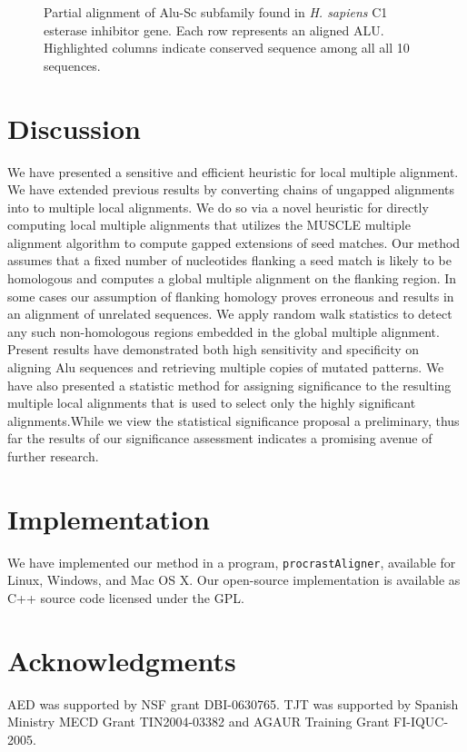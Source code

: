\documentclass{ws-procs9x6}
\begin{document}
\begin{figure}[t]
\centering {}
\caption{Partial alignment of Alu-Sc subfamily found in \emph{H. sapiens} C1 esterase inhibitor gene. Each row represents an aligned ALU. Highlighted columns indicate conserved sequence among all all 10 sequences.}
\label{fig-align}
\end{figure}

\section{Discussion}

We have presented a sensitive and efficient heuristic for local multiple alignment.
We have extended previous results by converting chains of ungapped alignments into to multiple local alignments. We do so via a novel heuristic for directly computing local multiple alignments that utilizes the MUSCLE multiple alignment algorithm to compute gapped extensions of seed matches.  Our method assumes that a fixed number of nucleotides flanking a seed match is likely to be homologous and computes a global multiple alignment on the flanking region.  In some cases our assumption of flanking homology proves erroneous and results in an alignment of unrelated sequences.  We apply random walk statistics to detect any such non-homologous regions embedded in the global multiple alignment.
Present results have demonstrated both high sensitivity and specificity on aligning Alu
sequences and retrieving multiple copies of mutated patterns. We have also presented a statistic method for assigning significance to the resulting multiple local alignments that is used to select only the highly significant alignments.While we view the statistical significance proposal a preliminary, thus far the results of our significance assessment indicates a promising avenue of further research.

\section{Implementation}
We have implemented our method in a program, \texttt{procrastAligner}, available for Linux, Windows, and Mac OS X. Our open-source implementation is available as C++ source code licensed under the GPL.

\section{ Acknowledgments }
AED was supported by NSF grant DBI-0630765. TJT was
supported by Spanish Ministry MECD Grant TIN2004-03382 and AGAUR
Training Grant FI-IQUC-2005.




\end{document}
